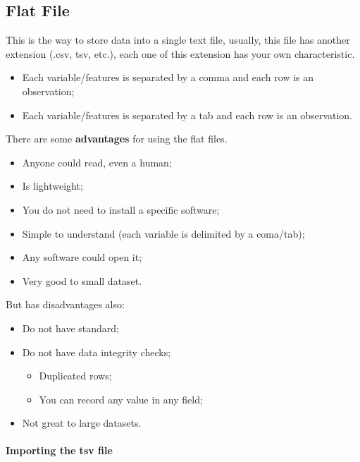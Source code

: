 \documentclass[]{book}
\providecommand{\tightlist}{%
  \setlength{\itemsep}{0pt}\setlength{\parskip}{0pt}}
\let\oldparagraph\paragraph
\renewcommand{\paragraph}[1]{\oldparagraph{#1}\mbox{}}
\begin{document}
\subsection{Flat File}\label{flat-file}

This is the way to store data into a single text file, usually, this
file has another extension (.csv, tsv, etc.), each one of this extension
has your own characteristic.

\begin{itemize}
\tightlist
\item
  Each variable/features is separated by a comma and each row is an
  observation;
\item
  Each variable/features is separated by a tab and each row is an
  observation.
\end{itemize}

There are some \textbf{advantages} for using the flat files.

\begin{itemize}
\tightlist
\item
  Anyone could read, even a human;
\item
  Is lightweight;
\item
  You do not need to install a specific software;
\item
  Simple to understand (each variable is delimited by a coma/tab);
\item
  Any software could open it;
\item
  Very good to small dataset.
\end{itemize}

But has disadvantages also:

\begin{itemize}
\tightlist
\item
  Do not have standard;
\item
  Do not have data integrity checks;

  \begin{itemize}
  \tightlist
  \item
    Duplicated rows;
  \item
    You can record any value in any field;
  \end{itemize}
\item
  Not great to large datasets.
\end{itemize}

\paragraph{Importing the tsv file}\label{importing-the-tsv-file}
\end{document}
